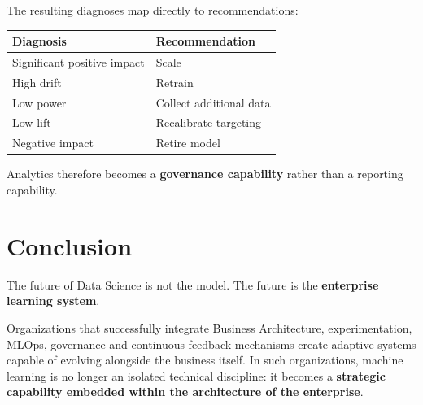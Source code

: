 \documentclass[
  a4paper,
  DIV=11,
  numbers=noendperiod]{scrartcl}
\newcounter{none} %
\begin{document}
The resulting diagnoses map directly to recommendations:

{\def\LTcaptype{none} %
\begin{longtable}[]{@{}ll@{}}
\toprule\noalign{}
Diagnosis & Recommendation \\
\midrule\noalign{}
\endhead
\bottomrule\noalign{}
\endlastfoot
Significant positive impact & Scale \\
High drift & Retrain \\
Low power & Collect additional data \\
Low lift & Recalibrate targeting \\
Negative impact & Retire model \\
\end{longtable}
}

Analytics therefore becomes a \textbf{governance capability} rather than
a reporting capability.

\section{Conclusion}\label{conclusion}

The future of Data Science is not the model. The future is the
\textbf{enterprise learning system}.

Organizations that successfully integrate Business Architecture,
experimentation, MLOps, governance and continuous feedback mechanisms
create adaptive systems capable of evolving alongside the business
itself. In such organizations, machine learning is no longer an isolated
technical discipline: it becomes a \textbf{strategic capability embedded
within the architecture of the enterprise}.


\printbibliography
\end{document}
